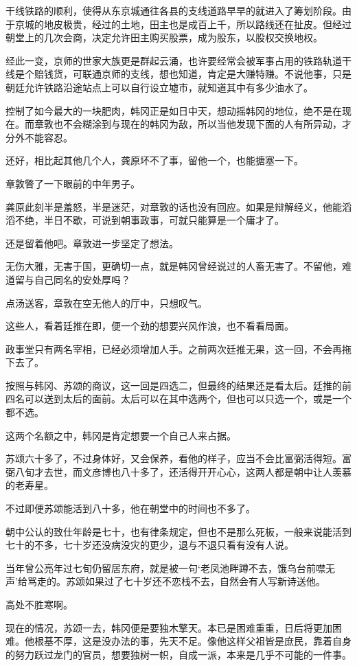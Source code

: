 干线铁路的顺利，使得从东京城通往各县的支线道路早早的就进入了筹划阶段。由于京城的地皮极贵，经过的土地，田主也是成百上千，所以路线还在扯皮。但经过朝堂上的几次会商，决定允许田主购买股票，成为股东，以股权交换地权。

经此一变，京师的世家大族更是群起云涌，也许要经常会被军事占用的铁路轨道干线是个赔钱货，可联通京师的支线，想也知道，肯定是大赚特赚。不说他事，只是朝廷允许铁路沿途站点上可以自行设立墟市，就知道其中有多少油水了。

控制了如今最大的一块肥肉，韩冈正是如日中天，想动摇韩冈的地位，绝不是在现在。而章敦也不会糊涂到与现在的韩冈为敌，所以当他发现下面的人有所异动，才分外不能容忍。

还好，相比起其他几个人，龚原坏不了事，留他一个，也能搪塞一下。

章敦瞥了一下眼前的中年男子。

龚原此刻半是羞怒，半是迷茫，对章敦的话也没有回应。如果是辩解经义，他能滔滔不绝，半日不歇，可说到朝事政事，可就只能算是一个庸才了。

还是留着他吧。章敦进一步坚定了想法。

无伤大雅，无害于国，更确切一点，就是韩冈曾经说过的人畜无害了。不留他，难道留与自己同名的安处厚吗？

点汤送客，章敦在空无他人的厅中，只想叹气。

这些人，看着廷推在即，便一个劲的想要兴风作浪，也不看看局面。

政事堂只有两名宰相，已经必须增加人手。之前两次廷推无果，这一回，不会再拖下去了。

按照与韩冈、苏颂的商议，这一回是四选二，但最终的结果还是看太后。廷推的前四名可以送到太后的面前。太后可以在其中选两个，但也可以只选一个，或是一个都不选。

这两个名额之中，韩冈是肯定想要一个自己人来占据。

苏颂六十多了，不过身体好，又会保养，看他的样子，应当不会比富弼活得短。富弼八旬才去世，而文彦博也八十多了，还活得开开心心，这两人都是朝中让人羡慕的老寿星。

不过即便苏颂能活到八十多，他在朝堂中的时间也不多了。

朝中公认的致仕年龄是七十，也有律条规定，但也不是那么死板，一般来说能活到七十的不多，七十岁还没病没灾的更少，退与不退只看有没有人说。

当年曾公亮年过七旬仍留居东府，就是被一句‘老凤池畔蹲不去，饿乌台前噤无声’给骂走的。苏颂如果过了七十岁还不恋栈不去，自然会有人写新诗送他。

高处不胜寒啊。

现在的情况，苏颂一去，韩冈便是要独木擎天。本已是困难重重，日后将更加困难。他根基不厚，这是没办法的事，先天不足。像他这样父祖皆是庶民，靠着自身的努力跃过龙门的官员，想要独树一帜，自成一派，本来是几乎不可能的一件事。

